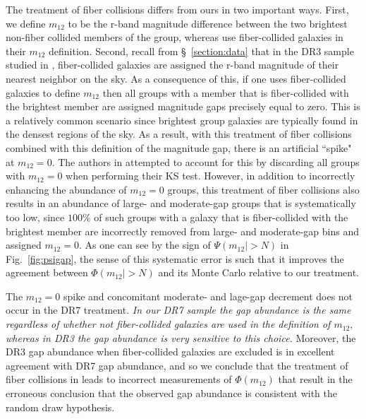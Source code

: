 \documentclass[usenatbib,usegraphicx,letterpaper]{mn2e}
\newcommand{\monetwo}{m_{12}}
\begin{document}
 The \citet{paranjape_sheth11} treatment of fiber collisions differs from ours in two important ways. First, we define $\monetwo$ to be the r-band magnitude difference between the two brightest non-fiber collided members of the group, whereas \citet{paranjape_sheth11} use fiber-collided galaxies in their $\monetwo$ definition. Second, recall from \S~\ref{section:data} that in the DR3 sample studied in \citet{paranjape_sheth11}, fiber-collided galaxies are assigned the r-band magnitude of their nearest neighbor on the sky. As a consequence of this, if one uses fiber-collided galaxies to define $\monetwo$ then all groups with a member that is fiber-collided with the brightest member are assigned magnitude gaps precisely equal to zero. This is a relatively common scenario since brightest group galaxies are typically found in the densest regions of the sky. As a result, with this treatment of fiber collisions combined with this definition of the magnitude gap, there is an artificial ``spike" at $\monetwo=0.$ The authors in \citet{paranjape_sheth11} attempted to account for this by discarding all groups with $\monetwo=0$ when performing their KS test. However, in addition to incorrectly enhancing the abundance of $\monetwo=0$ groups, this treatment of fiber collisions also results in an abundance of large- and moderate-gap groups that is systematically too low, since $100\%$ of such groups with a galaxy that is fiber-collided with the brightest member are incorrectly removed from large- and moderate-gap bins and assigned $\monetwo=0.$ As one can see by the sign of $\Psi(\monetwo|> N)$ in Fig.~\ref{fig:psigap}, the sense of this systematic error is such that it improves the agreement between $\Phi(\monetwo|> N)$ and its Monte Carlo relative to our treatment.

The $\monetwo=0$ spike and concomitant moderate- and lage-gap decrement does not occur in the DR7 treatment. {\em In our DR7 sample the gap abundance is the same regardless of whether not fiber-collided galaxies are used in the definition of $\monetwo,$ whereas in DR3 the gap abundance is very sensitive to this choice.} Moreover, the DR3 gap abundance when fiber-collided galaxies are excluded is in excellent agreement with DR7 gap abundance, and so we conclude that the treatment of fiber collisions in \citet{paranjape_sheth11} leads to incorrect measurements of $\Phi(\monetwo)$ that result in the erroneous conclusion that the observed gap abundance is consistent with the random draw hypothesis.
\end{document}
